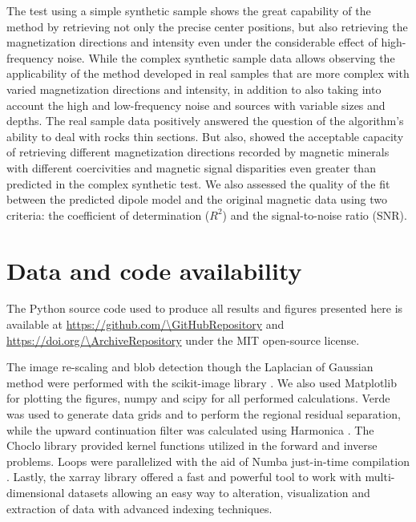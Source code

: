 The test using a simple synthetic sample shows the great capability of the method by retrieving not only the precise center positions, but also retrieving the magnetization directions and intensity even under the considerable effect of high-frequency noise. While the complex synthetic sample data allows observing the applicability of the method developed in real samples that are more complex with varied magnetization directions and intensity, in addition to also taking into account the high and low-frequency noise and sources with variable sizes and depths. The real sample data positively answered the question of the algorithm's ability to deal with rocks thin sections. But also, showed the acceptable capacity of retrieving different magnetization directions recorded by magnetic minerals with different coercivities and magnetic signal disparities even greater than predicted in the complex synthetic test. We also assessed the quality of the fit between the predicted dipole model and the original magnetic data using two criteria: the coefficient of determination ($R^2$) and the signal-to-noise ratio (SNR).


\section{Data and code availability}

The Python source code used to produce all results and figures presented here
is available at \url{https://github.com/\GitHubRepository} and
\url{https://doi.org/\ArchiveRepository} under the MIT open-source license.

The image re-scaling and blob detection though the Laplacian of Gaussian method
were performed with the scikit-image library \citep{VanderWalt2014}. We also used Matplotlib \citep{Hunter2007} for plotting the figures, numpy \citep{Harris2020} and scipy \citep{2020SciPy-NMeth} for all performed calculations. Verde \citep{verde2018} was used to generate data grids and to perform the regional residual separation, while the upward continuation filter was calculated using Harmonica \citep{harmonica2020}. The Choclo library \citep{choclo2022} provided kernel functions utilized in the forward and inverse problems. Loops were parallelized with the aid of Numba just-in-time compilation \citep{lam2015numba}. Lastly, the xarray library \citep{hoyer2017xarray} offered a fast and powerful tool to work with multi-dimensional datasets allowing an easy way to alteration, visualization and extraction of data with advanced indexing techniques.

